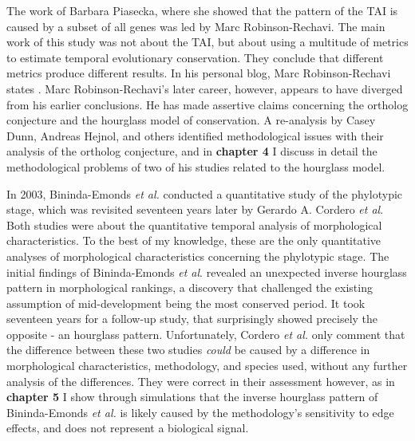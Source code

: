 The work of Barbara Piasecka, where she showed that the pattern of the TAI is caused by a subset of all genes was led by Marc Robinson-Rechavi. The main work of this study was not about the TAI, but about using a multitude of metrics to estimate temporal evolutionary conservation. They conclude that different metrics produce different results. In his personal blog, Marc Robinson-Rechavi states \cite{robinsonrechaviblog}. Marc Robinson-Rechavi's later career, however, appears to have diverged from his earlier conclusions. He has made assertive claims concerning the ortholog conjecture\cite{KryuchkovaMostacci2016} and the hourglass model of conservation\cite{Liu2020,Liu2021,marletaz2018}. A re-analysis by Casey Dunn, Andreas Hejnol, and others identified methodological issues with their analysis of the ortholog conjecture\cite{Dunn2018}, and in \textbf{chapter 4} I discuss in detail the methodological problems of two of his studies related to the hourglass model.

In 2003, Bininda-Emonds \textit{et al.} conducted a quantitative study of the phylotypic stage, which was revisited seventeen years later by Gerardo A. Cordero \textit{et al}\cite{OlafRP2003, Cordero2020}. Both studies were about the quantitative temporal analysis of morphological characteristics. To the best of my knowledge, these are the only quantitative analyses of morphological characteristics concerning the phylotypic stage. The initial findings of Bininda-Emonds \textit{et al}. revealed an unexpected inverse hourglass pattern in morphological rankings, a discovery that challenged the existing assumption of mid-development being the most conserved period. It took seventeen years for a follow-up study, that surprisingly showed precisely the opposite - an hourglass pattern. Unfortunately, Cordero \textit{et al.} only comment that the difference between these two studies \textit{could} be caused by a difference in morphological characteristics, methodology, and species used, without any further analysis of the differences. They were correct in their assessment however, as in \textbf{chapter 5} I show through simulations that the inverse hourglass pattern of Bininda-Emonds \textit{et al.} is likely caused by the methodology's sensitivity to edge effects, and does not represent a biological signal.

